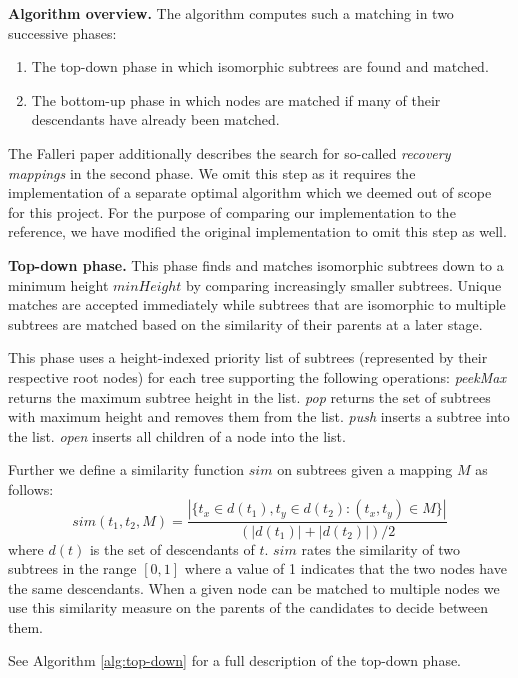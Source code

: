 \documentclass[letterpaper]{article}
\newcommand{\mypar}[1]{{\bf #1.}}
\begin{document}
\mypar{Algorithm overview}
The algorithm computes such a matching in two successive phases:
\begin{enumerate}
	\item The top-down phase in which isomorphic subtrees are found and matched.
	\item The bottom-up phase in which nodes are matched if many of their descendants have already been matched.
\end{enumerate}
The Falleri paper additionally describes the search for so-called \emph{recovery mappings} in the second phase.
We omit this step as it requires the implementation of a separate optimal algorithm which we deemed out of scope for this project.
For the purpose of comparing our implementation to the reference, we have modified the original implementation to omit this step as well.

\mypar{Top-down phase}
This phase finds and matches isomorphic subtrees down to a minimum height $minHeight$ by comparing increasingly smaller subtrees.
Unique matches are accepted immediately while subtrees that are isomorphic to multiple subtrees are matched based on the similarity of their parents at a later stage.

This phase uses a height-indexed priority list of subtrees (represented by their respective root nodes) for each tree supporting the following operations:
\emph{peekMax} returns the maximum subtree height in the list.
\emph{pop} returns the set of subtrees with maximum height and removes them from the list.
\emph{push} inserts a subtree into the list.
\emph{open} inserts all children of a node into the list.

Further we define a similarity function $sim$ on subtrees given a mapping $M$ as follows:
$$ sim(t_1, t_2, M) = \frac{| \{ t_x \in d(t_1), t_y \in d(t_2) : (t_x, t_y) \in M \} | }{ (|d(t_1)| + |d(t_2)|) / 2} $$
where $d(t)$ is the set of descendants of $t$. $sim$ rates the similarity of two subtrees in the range $[0,1]$ where a value of 1 indicates that the two nodes have the same descendants.
When a given node can be matched to multiple nodes we use this similarity measure on the parents of the candidates to decide between them.

See Algorithm \ref{alg:top-down} for a full description of the top-down phase.

\SetAlFnt{\footnotesize}
\SetInd{0.3em}{0.6em}
\SetAlgoVlined
\end{document}
